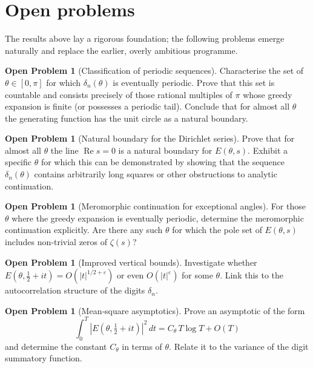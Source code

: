 \documentclass[11pt,a4paper]{article}
\theoremstyle{definition}
\newtheorem{problem}[theorem]{Open Problem}
\theoremstyle{remark}
\begin{document}
\section{Open problems}
The results above lay a rigorous foundation; the following problems emerge naturally and replace the earlier, overly ambitious programme.

\begin{problem}[Classification of periodic sequences]\label{prob:periodic}
Characterise the set of \(\theta\in[0,\pi]\) for which \(\delta_n(\theta)\) is eventually periodic.
Prove that this set is countable and consists precisely of those rational multiples of \(\pi\) whose greedy expansion is finite (or possesses a periodic tail).
Conclude that for almost all \(\theta\) the generating function has the unit circle as a natural boundary.
\end{problem}

\begin{problem}[Natural boundary for the Dirichlet series]\label{prob:natural}
Prove that for almost all \(\theta\) the line \(\operatorname{Re}s=0\) is a natural boundary for \(E(\theta,s)\).
Exhibit a specific \(\theta\) for which this can be demonstrated by showing that the sequence \(\delta_n(\theta)\) contains arbitrarily long squares or other obstructions to analytic continuation.
\end{problem}

\begin{problem}[Meromorphic continuation for exceptional angles]
For those \(\theta\) where the greedy expansion is eventually periodic, determine the meromorphic continuation explicitly.
Are there any such \(\theta\) for which the pole set of \(E(\theta,s)\) includes non‑trivial zeros of \(\zeta(s)\)?
\end{problem}

\begin{problem}[Improved vertical bounds]
Investigate whether \(E(\theta,\frac12+it)=O(|t|^{1/2+\varepsilon})\) or even \(O(|t|^{\varepsilon})\) for some \(\theta\).
Link this to the autocorrelation structure of the digits \(\delta_n\).
\end{problem}

\begin{problem}[Mean‑square asymptotics]
Prove an asymptotic of the form
\[
\int_0^T |E(\theta,\tfrac12+it)|^2\,dt = C_\theta\, T\log T + O(T)
\]
and determine the constant \(C_\theta\) in terms of \(\theta\).
Relate it to the variance of the digit summatory function.
\end{problem}
\end{document}
